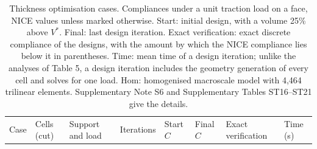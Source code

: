 \documentclass[preprint,12pt,authoryear]{elsarticle}
\begin{document}
{\scriptsize
\begin{longtable}[]{@{}
  >{\raggedright\arraybackslash}p{}
  >{\raggedright\arraybackslash}p{}
  >{\raggedright\arraybackslash}p{}
  >{\raggedleft\arraybackslash}p{}
  >{\raggedleft\arraybackslash}p{}
  >{\raggedleft\arraybackslash}p{}
  >{\raggedright\arraybackslash}p{}
  >{\raggedleft\arraybackslash}p{}@{}}
\caption{Thickness optimisation cases. Compliances under a unit traction load on a face, NICE values unless marked otherwise. Start: initial design, with a volume 25\% above \(V^*\). Final: last design iteration. Exact verification: exact discrete compliance of the designs, with the amount by which the NICE compliance lies below it in parentheses. Time: mean time of a design iteration; unlike the analyses of Table 5, a design iteration includes the geometry generation of every cell and solves for one load. Hom: homogenised macroscale model with 4,464 trilinear elements. Supplementary Note S6 and Supplementary Tables ST16--ST21 give the details.}\tabularnewline
\toprule\noalign{}
\begin{minipage}[b]{\linewidth}\raggedright
Case
\end{minipage} & \begin{minipage}[b]{\linewidth}\raggedright
Cells (cut)
\end{minipage} & \begin{minipage}[b]{\linewidth}\raggedright
Support and load
\end{minipage} & \begin{minipage}[b]{\linewidth}\raggedleft
Iterations
\end{minipage} & \begin{minipage}[b]{\linewidth}\raggedleft
Start \(C\)
\end{minipage} & \begin{minipage}[b]{\linewidth}\raggedleft
Final \(C\)
\end{minipage} & \begin{minipage}[b]{\linewidth}\raggedright
Exact verification
\end{minipage} & \begin{minipage}[b]{\linewidth}\raggedleft
Time (s)
\end{minipage} \\

\end{longtable}}
\end{document}
